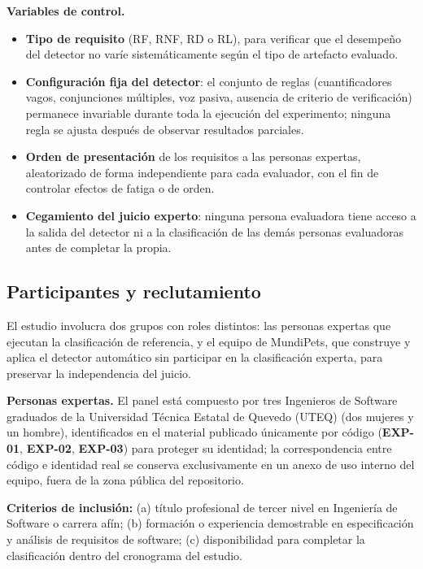 \documentclass[journal,onecolumn]{IEEEtran}
\begin{document}
	\textbf{Variables de control.}
	\begin{itemize}[leftmargin=*]
		\item \textbf{Tipo de requisito} (RF, RNF, RD o RL), para verificar que el
		desempeño del detector no varíe sistemáticamente según el tipo de
		artefacto evaluado.
		\item \textbf{Configuración fija del detector}: el conjunto de reglas
		(cuantificadores vagos, conjunciones múltiples, voz pasiva, ausencia de
		criterio de verificación) permanece invariable durante toda la
		ejecución del experimento; ninguna regla se ajusta después de observar
		resultados parciales.
		\item \textbf{Orden de presentación} de los requisitos a las personas
		expertas, aleatorizado de forma independiente para cada evaluador, con
		el fin de controlar efectos de fatiga o de orden.
		\item \textbf{Cegamiento del juicio experto}: ninguna persona
		evaluadora tiene acceso a la salida del detector ni a la clasificación
		de las demás personas evaluadoras antes de completar la propia.
	\end{itemize}
	
	\subsection{Participantes y reclutamiento}
	\label{sec:participantes}
	
	El estudio involucra dos grupos con roles distintos: las personas expertas
	que ejecutan la clasificación de referencia, y el equipo de MundiPets, que
	construye y aplica el detector automático sin participar en la
	clasificación experta, para preservar la independencia del juicio.
	
	\textbf{Personas expertas.} El panel está compuesto por tres Ingenieros de
	Software graduados de la Universidad Técnica Estatal de Quevedo (UTEQ) (dos
	mujeres y un hombre), identificados en el material publicado únicamente por
	código (\textbf{EXP-01}, \textbf{EXP-02}, \textbf{EXP-03}) para proteger su
	identidad; la correspondencia entre código e identidad real se conserva
	exclusivamente en un anexo de uso interno del equipo, fuera de la zona
	pública del repositorio.
	
	\textbf{Criterios de inclusión:} (a) título profesional de tercer nivel en
	Ingeniería de Software o carrera afín; (b) formación o experiencia
	demostrable en especificación y análisis de requisitos de software; (c)
	disponibilidad para completar la clasificación dentro del cronograma del
	estudio.
	
\end{document}

